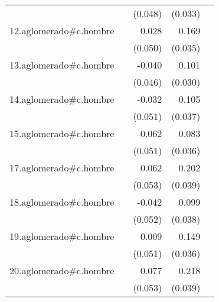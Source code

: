 {\begin{longtable}{l*{4}{D{.}{.}{-1}}}
            &                     &     (0.048)         &     (0.033)         &                     \\
\addlinespace
12.aglomerado#c.hombre&                     &       0.028         &       0.169\sym{***}&                     \\
            &                     &     (0.050)         &     (0.035)         &                     \\
\addlinespace
13.aglomerado#c.hombre&                     &      -0.040         &       0.101\sym{***}&                     \\
            &                     &     (0.046)         &     (0.030)         &                     \\
\addlinespace
14.aglomerado#c.hombre&                     &      -0.032         &       0.105\sym{**} &                     \\
            &                     &     (0.051)         &     (0.037)         &                     \\
\addlinespace
15.aglomerado#c.hombre&                     &      -0.062         &       0.083\sym{*}  &                     \\
            &                     &     (0.051)         &     (0.036)         &                     \\
\addlinespace
17.aglomerado#c.hombre&                     &       0.062         &       0.202\sym{***}&                     \\
            &                     &     (0.053)         &     (0.039)         &                     \\
\addlinespace
18.aglomerado#c.hombre&                     &      -0.042         &       0.099\sym{**} &                     \\
            &                     &     (0.052)         &     (0.038)         &                     \\
\addlinespace
19.aglomerado#c.hombre&                     &       0.009         &       0.149\sym{***}&                     \\
            &                     &     (0.051)         &     (0.036)         &                     \\
\addlinespace
20.aglomerado#c.hombre&                     &       0.077         &       0.218\sym{***}&                     \\
            &                     &     (0.053)         &     (0.039)         &                     \\

\end{longtable}}
